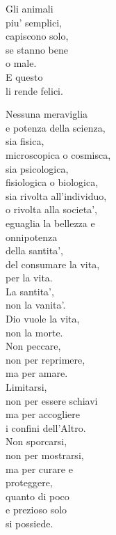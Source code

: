 \begin{haiku}
    Gli animali\\
    piu' semplici,\\
    capiscono solo,\\
    se stanno bene \\
    o male.\\
    E questo\\
    li rende felici.\\
\end{haiku}

\begin{haiku}
    Nessuna meraviglia\\
    e potenza della scienza,\\
    sia fisica, \\
    microscopica o cosmisca,\\
    sia psicologica,\\
    fisiologica o biologica,\\
    sia rivolta all'individuo, \\
    o rivolta alla societa',\\
    eguaglia la bellezza e\\
    onnipotenza\\
    della santita',\\
    del consumare la vita,\\
    per la vita.\\
    La santita',\\
    non la vanita'.\\
    Dio vuole la vita,\\
    non la morte.\\
    Non peccare,\\
    non per reprimere,\\
    ma per amare.\\
    Limitarsi, \\
    non per essere schiavi\\
    ma per accogliere \\
    i confini dell'Altro.\\
    Non sporcarsi,\\
    non per mostrarsi,\\
    ma per curare e\\
    proteggere,\\
    quanto di poco\\
    e prezioso solo\\
    si possiede.\\
\end{haiku}


